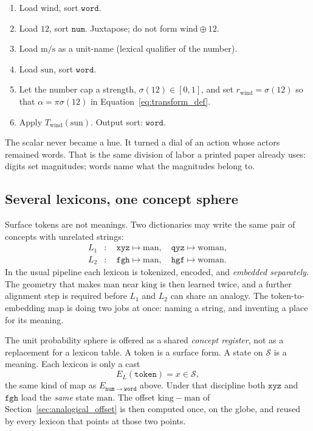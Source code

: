 \documentclass[12pt, a4paper]{article}
\begin{document}
\begin{enumerate}
    \item Load $\mathrm{wind}$, sort $\mathtt{word}$.
    \item Load $12$, sort $\mathtt{num}$. Juxtapose; do not form
          $\mathrm{wind}\oplus 12$.
    \item Load $\mathrm{m/s}$ as a unit-name (lexical qualifier of the
          number).
    \item Load $\mathrm{sun}$, sort $\mathtt{word}$.
    \item Let the number cap a strength,
          $\sigma(12)\in[0,1]$, and set
          $r_{\mathrm{wind}}=\sigma(12)$ so that
          $\alpha=\pi\sigma(12)$ in Equation~\eqref{eq:transform_def}.
    \item Apply $T_{\mathrm{wind}}(\mathrm{sun})$. Output sort:
          $\mathtt{word}$.
\end{enumerate}
The scalar never became a hue. It turned a dial of an action whose
actors remained words. That is the same division of labor a printed
paper already uses: digits set magnitudes; words name what the
magnitudes belong to.

\subsection{Several lexicons, one concept sphere}
\label{subsec:shared_lexicons}
Surface tokens are not meanings. Two dictionaries may write the same
pair of concepts with unrelated strings:
\begin{equation}
    \begin{aligned}
        L_1&: \quad \texttt{xyz}\mapsto\mathrm{man},\quad
                    \texttt{qyz}\mapsto\mathrm{woman},\\
        L_2&: \quad \texttt{fgh}\mapsto\mathrm{man},\quad
                    \texttt{hgf}\mapsto\mathrm{woman}.
    \end{aligned}
    \label{eq:two_lexicons}
\end{equation}
In the usual pipeline each lexicon is tokenized, encoded, and
\emph{embedded separately}. The geometry that makes
$\mathrm{man}$ near $\mathrm{king}$ is then learned twice, and a
further alignment step is required before $L_1$ and $L_2$ can share
an analogy. The token-to-embedding map is doing two jobs at once:
naming a string, and inventing a place for its meaning.

The unit probability sphere is offered as a shared
\emph{concept register}, not as a replacement for a lexicon table.
A token is a surface form. A state on $\mathcal{S}$ is a meaning.
Each lexicon is only a cast
\begin{equation}
    E_{L}(\texttt{token}) = x\in\mathcal{S},
    \label{eq:lexicon_cast}
\end{equation}
the same kind of map as $E_{\mathtt{num}\to\mathtt{word}}$ above.
Under that discipline both $\texttt{xyz}$ and $\texttt{fgh}$ load the
\emph{same} state $\mathrm{man}$. The offset
$\mathrm{king}-\mathrm{man}$ of Section~\ref{sec:analogical_offset}
is then computed once, on the globe, and reused by every lexicon that
points at those two points.
\end{document}
